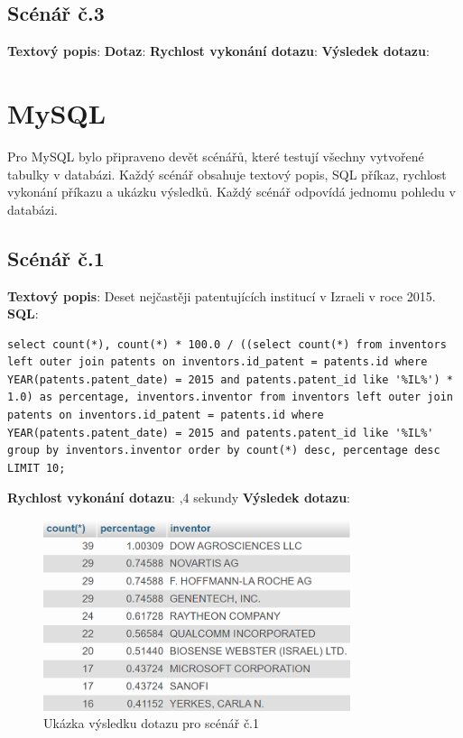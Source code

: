 \subsection{Scénář č.3}
\textbf{Textový popis}: 
\newline
\textbf{Dotaz}: 
\newline
\textbf{Rychlost vykonání dotazu}:
\newline
\textbf{Výsledek dotazu}:

\section{MySQL} \label{sec:efektivni_vytezovani_sql}
Pro MySQL bylo připraveno devět scénářů, které testují všechny vytvořené tabulky v databázi. Každý scénář obsahuje textový popis, SQL příkaz, rychlost vykonání příkazu a ukázku výsledků. Každý scénář odpovídá jednomu pohledu v databázi.

\newpage
\subsection{Scénář č.1}
\textbf{Textový popis}: Deset nejčastěji patentujících institucí v Izraeli v roce 2015.
\newline
\textbf{SQL}: 
\begin{lstlisting}[label = {lst:elements_a}]
select count(*), count(*) * 100.0 / ((select count(*) from inventors left outer join patents on inventors.id_patent = patents.id where YEAR(patents.patent_date) = 2015 and patents.patent_id like '%IL%') * 1.0) as percentage, inventors.inventor from inventors left outer join patents on inventors.id_patent = patents.id where YEAR(patents.patent_date) = 2015 and patents.patent_id like '%IL%' group by inventors.inventor order by count(*) desc, percentage desc LIMIT 10;
\end{lstlisting}
\textbf{Rychlost vykonání dotazu}:  ,4 sekundy
\newline
\textbf{Výsledek dotazu}:
\begin{figure}[H]
\centering
\includegraphics[width=9cm]{img/scenare/scenar_1}
\caption{Ukázka výsledku dotazu pro scénář č.1}
\label{fig:scenar1}
\end{figure}

